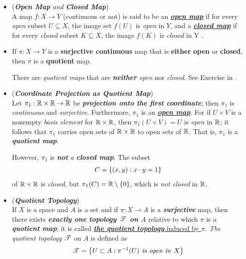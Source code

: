 \documentclass[11pt]{article}
\begin{document}
\begin{itemize}
\item \begin{definition} (\emph{\textbf{Open Map} and \textbf{Closed Map}})\\
A map $f: X \rightarrow Y$ (continuous or not) is said to be an \underline{\emph{\textbf{open map}}} if for every \emph{open} subset $U \subseteq X$, the image set $f(U)$ is \emph{open} in $Y$, and a  \underline{\emph{\textbf{closed map}}} if for every \emph{closed} subset $K \subseteq X$, the image $f(K)$ is \emph{closed} in Y . 
\end{definition}

\item \begin{proposition}
If $\pi: X \rightarrow Y$ is a \textbf{surjective continuous} map that is \textbf{either} \textbf{open} or \textbf{closed}, then $\pi$ is a \textbf{quotient} map.
\end{proposition}
\begin{remark}
There are \emph{quotient maps} that are \emph{\textbf{neither}} \emph{open} nor \emph{closed}. See Exercise in \citep{munkres2000topology}.
\end{remark}

\item \begin{example} (\emph{\textbf{Coordinate Projection as Quotient Map}})\\
Let $\pi_1 : {\mathbb R} \times {\mathbb R} \rightarrow {\mathbb R}$ be \emph{\textbf{projection onto the first coordinate}}; then $\pi_1$ is \emph{continuous} and \emph{surjective}. Furthermore, $\pi_1$ is an \underline{\emph{\textbf{open map}}}. For if $U \times V$ is a nonempty \emph{basis element} for ${\mathbb R} \times {\mathbb R}$, then $\pi_1(U \times V) = U$ is \emph{open} in ${\mathbb R}$; it follows that $\pi_1$ carries open sets of ${\mathbb R} \times {\mathbb R}$ to open sets of ${\mathbb R}$. That is, $\pi_1$ is a \emph{\textbf{quotient map}}.

However, $\pi_1$ is \emph{\textbf{not} a \textbf{closed map}}. The subset
\begin{align*}
C = \left\{(x, y): x \cdot y =1\right\}
\end{align*}
of ${\mathbb R} \times {\mathbb R}$ is \emph{closed}, but $\pi_1(C) = {\mathbb R} \setminus \{0\}$, which is \emph{not closed} in ${\mathbb R}$.
\end{example}

\item \begin{definition} (\emph{\textbf{Quotient Topology}})\\
If $X$ is a space and $A$ is a set and if $\pi: X \rightarrow A$ is a \textbf{\emph{surjective}} map, then there exists \textbf{\emph{exactly one topology ${\mathscr T}$ on $A$}} relative to which $\pi$ is a \emph{\textbf{quotient map}}; it is called \underline{\emph{\textbf{the quotient topology}} induced by $\pi$}. \emph{The quotient topology} ${\mathscr T}$ on $A$ is defined as
\begin{align*}
{\mathscr T} = \left\{U \subset A:  \pi^{-1}(U) \text{\emph{ is open in }} X\right\}
\end{align*}
\end{definition}




\end{itemize}
\end{document}
